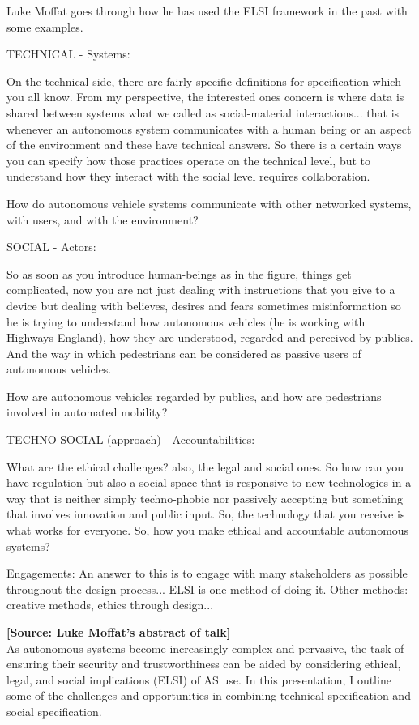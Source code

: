 \documentclass[sigconf]{acmart}
\begin{document}
Luke Moffat goes through how he has used the ELSI framework in the past with some examples.

TECHNICAL - Systems:

On the technical side, there are fairly specific definitions for specification which you all know. 
From my perspective, the interested ones concern is where data is shared between systems what we called as social-material interactions... that is whenever an autonomous system communicates with a human being or an aspect of the environment and these have technical answers. So there is a certain ways you can specify how those practices operate on the technical level, but to understand how they interact with the social level requires collaboration. 

How do autonomous vehicle systems communicate with other networked systems, with users, and with the environment?

SOCIAL - Actors:

So as soon as you introduce human-beings as in the figure, things get complicated, now you are not just dealing with instructions that you give to a device but dealing with believes, desires and fears sometimes misinformation so he is trying to understand how  autonomous vehicles (he is working with Highways England), how they are understood, regarded and perceived by publics. And the way in which pedestrians can be considered as passive users of autonomous vehicles. 

How are autonomous vehicles regarded by publics, and how are pedestrians involved in automated mobility?

TECHNO-SOCIAL (approach) - Accountabilities:

What are the ethical challenges? also, the legal and social ones. 
So how can you have regulation but also a social space that is responsive to new technologies in a way that is neither simply techno-phobic nor passively accepting but something that involves innovation and public input. So, the technology that you receive is what works for everyone. So, how you make ethical and accountable autonomous systems?

Engagements: 
An answer to this is to engage with many stakeholders as possible throughout the design process... ELSI is one method of doing it. Other methods: creative methods, ethics through design...

\noindent\textbf{[Source: Luke Moffat's abstract of talk]}\\
As autonomous systems become increasingly complex and pervasive, the task of ensuring their security and trustworthiness can be aided by considering ethical, legal, and social implications (ELSI) of AS use. In this presentation, I outline some of the challenges and opportunities in combining technical specification and social specification.
\end{document}
